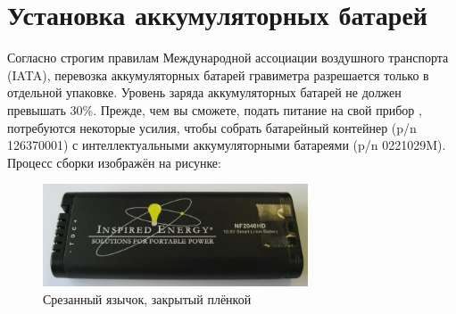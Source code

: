 \section{Установка аккумуляторных батарей}

Согласно строгим правилам Международной ассоциации воздушного транспорта (IATA),
перевозка аккумуляторных батарей гравиметра \cg{} разрешается только в отдельной
упаковке. Уровень заряда аккумуляторных батарей не должен превышать 30\%.
Прежде, чем вы сможете, подать питание на свой прибор \cg{}, потребуются некоторые
усилия, чтобы собрать батарейный контейнер (p/n 126370001) с интеллектуальными
аккумуляторными батареями (p/n 0221029M). Процесс сборки изображён на рисунке:


\begin{figure}[h]
  \centering
  \includegraphics[width=0.7\textwidth]{figures/removing_the_pull_tab_and_covering_with_tape}
  \caption{Срезанный язычок, закрытый плёнкой}
  \label{fig:removing_the_pull_tab_and_covering_with_tape}
\end{figure}


